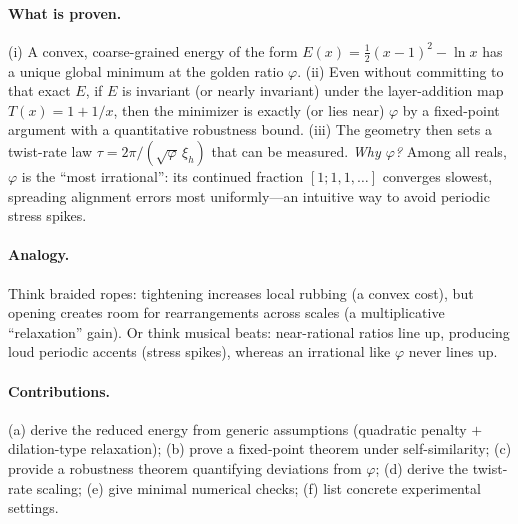 \documentclass[11pt]{article}
\theoremstyle{remark}
\theoremstyle{definition}
\newcommand{\ph}{\varphi}
\begin{document}
\paragraph{What is proven.} (i) A convex, coarse-grained energy of the form $E(x)=\tfrac12(x-1)^2-\ln x$ has a unique global minimum at the golden ratio $\ph$. (ii) Even without committing to that exact $E$, if $E$ is invariant (or nearly invariant) under the layer-addition map $T(x)=1+1/x$, then the minimizer is exactly (or lies near) $\ph$ by a fixed-point argument with a quantitative robustness bound. (iii) The geometry then sets a twist-rate law $\tau=2\pi/(\sqrt{\ph}\,\xi_h)$ that can be measured. \emph{Why $\ph$?} Among all reals, $\ph$ is the ``most irrational'': its continued fraction $[1;1,1,\ldots]$ converges slowest, spreading alignment errors most uniformly---an intuitive way to avoid periodic stress spikes.

\paragraph{Analogy.} Think braided ropes: tightening increases local rubbing (a convex cost), but opening creates room for rearrangements across scales (a multiplicative ``relaxation'' gain). Or think musical beats: near-rational ratios line up, producing loud periodic accents (stress spikes), whereas an irrational like $\ph$ never lines up.

\paragraph{Contributions.} (a) derive the reduced energy from generic assumptions (quadratic penalty $+$ dilation-type relaxation); (b) prove a fixed-point theorem under self-similarity; (c) provide a robustness theorem quantifying deviations from $\ph$; (d) derive the twist-rate scaling; (e) give minimal numerical checks; (f) list concrete experimental settings.
\end{document}
